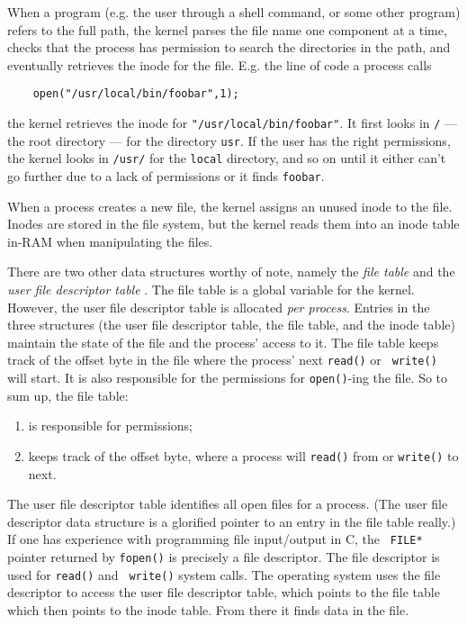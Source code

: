 When a program (e.g. the user through a shell command, or some
other program) refers to the full path, the kernel parses the
file name one component at a time, checks that the process has
permission to search the directories in the path, and eventually
retrieves the inode for the file. E.g. the line of code a process
calls
\begin{Verbatim}
    open("/usr/local/bin/foobar",1);
\end{Verbatim}
the kernel retrieves the inode for
\verb|"/usr/local/bin/foobar"|. It first looks in {\tt/} --- the
root directory --- for the directory {\tt usr}. If the user has
the right permissions, the kernel looks in {\tt/usr/} for the
{\tt local} directory, and so on until it either can't go further
due to a lack of permissions or it finds {\tt foobar}.

When a process creates a new file, the kernel assigns an unused
inode to the file. Inodes are stored in the file system, but the
kernel reads them into an inode table in-RAM when manipulating
the files.

There are two other data structures worthy of note, namely the
\emph{file table} and the \emph{user file descriptor table}
. The file
table is a global variable for the kernel. However, the user file
descriptor table is allocated \emph{per process}. Entries in the
three structures (the user file descriptor table, the file table,
and the inode table) maintain the state of the file and the
process' access to it. The file table keeps track of the offset
byte in the file where the process' next {\tt read()} or {\tt
  write()} will start. It is also responsible for the permissions
for {\tt open()}-ing the file. So to sum up, the file table:
\begin{enumerate}
\item is responsible for permissions;
\item keeps track of the offset byte, where a process will {\tt read()} from or {\tt write()} to next.
\end{enumerate}

The user file descriptor table identifies all open files for a
process. (The user file descriptor data structure is a glorified
pointer to an entry in the file table really.) If one has
experience with programming file input/output in C, the {\tt
  FILE*} pointer returned by {\tt fopen()} is precisely a file
descriptor. The file descriptor is used for {\tt read()} and {\tt
  write()} system calls. The operating system uses the file
descriptor to access the user file descriptor table, which points
to the file table which then points to the inode table. From
there it finds data in the file.

